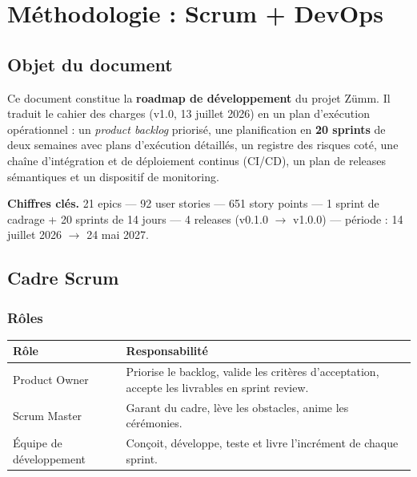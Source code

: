 \chapter{Méthodologie : Scrum + DevOps}
\label{chap:methodologie}

\section{Objet du document}

Ce document constitue la \textbf{roadmap de développement} du projet Zümm.
Il traduit le cahier des charges (v1.0, 13 juillet 2026) en un plan
d'exécution opérationnel : un \emph{product backlog} priorisé, une
planification en \textbf{20 sprints} de deux semaines avec plans d'exécution
détaillés, un registre des risques coté, une chaîne d'intégration et de
déploiement continus (CI/CD), un plan de releases sémantiques et un
dispositif de monitoring.

\begin{encadre}
\textbf{Chiffres clés.} 21 epics --- 92 user stories --- 651 story points ---
1 sprint de cadrage + 20 sprints de 14 jours --- 4 releases
(v0.1.0 $\rightarrow$ v1.0.0) --- période : 14 juillet 2026 $\rightarrow$
24 mai 2027.
\end{encadre}

\section{Cadre Scrum}

\subsection{Rôles}

\begin{center}
\begin{tabular}{lp{10.5cm}}
\toprule
\textbf{Rôle} & \textbf{Responsabilité} \\
\midrule
Product Owner & Priorise le backlog, valide les critères d'acceptation,
                accepte les livrables en sprint review. \\
Scrum Master  & Garant du cadre, lève les obstacles, anime les cérémonies. \\
Équipe de développement & Conçoit, développe, teste et livre l'incrément
                de chaque sprint. \\
\bottomrule
\end{tabular}
\end{center}

